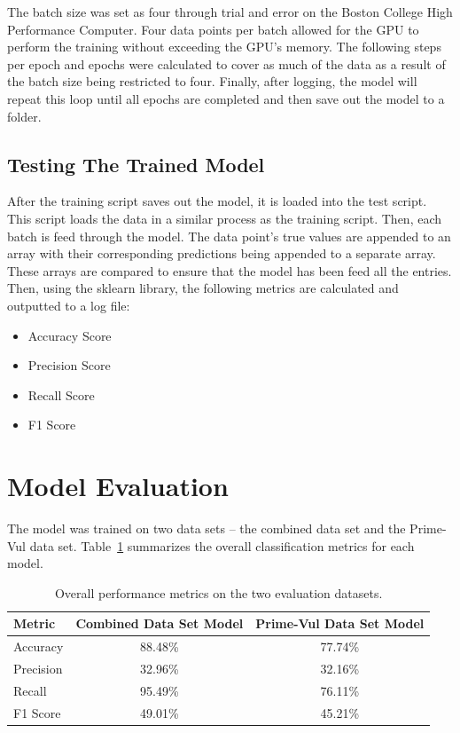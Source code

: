 \documentclass{article}
\begin{document}
\pagebreak

The batch size was set as four through trial and error on the Boston College High Performance Computer. Four data points per batch allowed for the GPU to perform the training without exceeding the GPU's memory. The following steps per epoch and epochs were calculated to cover as much of the data as a result of the batch size being restricted to four. Finally, after logging, the model will repeat this loop until all epochs are completed and then save out the model to a folder.

\subsection{Testing The Trained Model}

After the training script saves out the model, it is loaded into the test script. This script loads the data in a similar process as the training script. Then, each batch is feed through the model. The data point's true values are appended to an array with their corresponding predictions being appended to a separate array. These arrays are compared to ensure that the model has been feed all the entries. Then, using the sklearn library, the following metrics are calculated and outputted to a log file:

\begin{itemize}
\item Accuracy Score
\item Precision Score
\item Recall Score
\item F1 Score
\end{itemize}

\section{Model Evaluation}

The model was trained on two data sets -- the combined data set and the Prime-Vul data set. Table~\ref{tab:metrics} summarizes the overall classification metrics for each model.

\begin{table}[ht]
  \centering
  \begin{tabular}{|l|c|c|}
    \hline
    \textbf{Metric}   & \textbf{Combined Data Set Model} & \textbf{Prime-Vul Data Set Model} \\ 
    \hline 
    Accuracy          & 88.48\%                          & 77.74\%                  \\ 
    \hline
    Precision         & 32.96\%                          & 32.16\%                  \\ 
    \hline
    Recall            & 95.49\%                          & 76.11\%                  \\ 
    \hline
    F1 Score          & 49.01\%                          & 45.21\%                  \\ 
    \hline
  \end{tabular}
  \caption{Overall performance metrics on the two evaluation datasets.}
  \label{tab:metrics}
\end{table}
\end{document}
